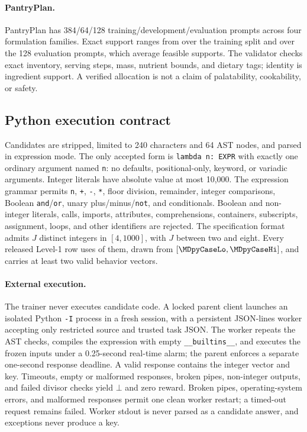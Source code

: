 \documentclass{article}
\newcommand{\1}{\mathbf 1}
\theoremstyle{remark}
\theoremstyle{definition}
\theoremstyle{plain}
\begin{document}
\paragraph{PantryPlan.}
\label{app:data-pantry}
PantryPlan has 384/64/128 training/development/evaluation
prompts across four formulation families. Exact support ranges from
\MDvmPantryTrainRange{} over the training split and \MDvmPantryRange{} over
the 128 evaluation prompts, which
average \MDvmPantryMean{} feasible supports.
The validator checks exact inventory, serving steps, mass, nutrient bounds,
and dietary tags; identity is ingredient support. A verified allocation is
not a claim of palatability, cookability, or safety.

\subsection{Python execution contract}
\label{app:python}
\label{app:python-language}

Candidates are stripped, limited to 240 characters and 64 AST nodes, and
parsed in expression mode. The only accepted form is \texttt{lambda n: EXPR}
with exactly one ordinary argument named \texttt{n}: no defaults,
positional-only, keyword, or variadic arguments. Integer literals have
absolute value at most 10,000. The expression grammar permits \texttt{n},
\texttt{+}, \texttt{-}, \texttt{*}, floor division, remainder, integer
comparisons, Boolean \texttt{and}/\texttt{or}, unary plus/minus/\texttt{not},
and conditionals. Boolean and non-integer literals, calls, imports,
attributes, comprehensions, containers, subscripts, assignment, loops, and
other identifiers are rejected. The specification format admits $J$ distinct
integers in $[4,1000]$, with $J$ between two and eight. Every released Level-1
row uses \MDpyCases{} of them, drawn from $[\MDpyCaseLo,\MDpyCaseHi]$, and
carries at least two valid behavior vectors.

\paragraph{External execution.}
\label{app:python-process}
The trainer never executes candidate code. A locked parent client launches
an isolated Python \texttt{-I} process in a fresh session, with a persistent
JSON-lines worker accepting only restricted source and trusted task JSON.
The worker repeats the AST checks, compiles the expression with empty
\texttt{\_\_builtins\_\_}, and executes the frozen inputs under a
0.25-second real-time alarm; the parent enforces a separate one-second
response deadline. A valid response contains the integer vector and key.
Timeouts, empty or malformed responses, broken pipes, non-integer outputs,
and failed divisor checks yield $\bot$ and zero reward. Broken pipes,
operating-system errors, and malformed responses permit one clean worker
restart; a timed-out request remains failed. Worker stdout is never parsed
as a candidate answer, and exceptions never produce a key.
\end{document}
